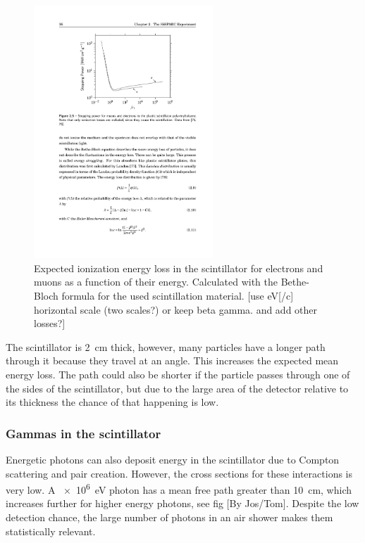 \begin{figure}
    \centering
    \includegraphics[width=0.6\textwidth]
                    {plots/station/bethe-bloch}
    \caption{Expected ionization energy loss in the scintillator for electrons and muons as a function of their energy. Calculated with the Bethe-Bloch formula for the used scintillation material. [use eV[/c] horizontal scale (two scales?) or keep beta gamma. and add other losses?]}
    \label{fig:bethe-bloch}
\end{figure}

The scintillator is \SI{2}{\centi\meter} thick, however, many particles have a longer path through it because they travel at an angle. This increases the expected mean energy loss. The path could also be shorter if the particle passes through one of the sides of the scintillator, but due to the large area of the detector relative to its thickness the chance of that happening is low.


\subsubsection{Gammas in the scintillator}

Energetic photons can also deposit energy in the scintillator due to Compton scattering and pair creation. However, the cross sections for these interactions is very low. A \SI{e6}{\eV} photon has a mean free path greater than \SI{10}{\centi\meter}, which increases further for higher energy photons, see fig [By Jos/Tom]. Despite the low detection chance, the large number of photons in an air shower makes them statistically relevant.

